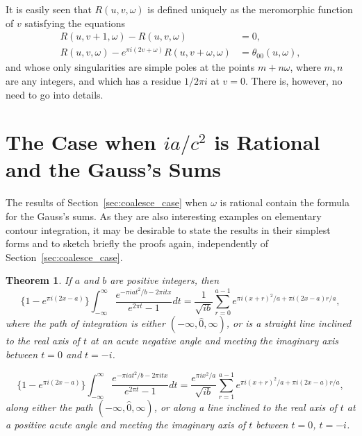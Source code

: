 \documentclass[12pt]{article}
\newtheorem{theorem}{Theorem}[section]
\theoremstyle{remark}
\begin{document}
It is easily seen that $R(u, v, \omega)$ is defined uniquely as the meromorphic function of $v$ satisfying the equations
\begin{align}
R(u, v + 1, \omega) - R(u, v, \omega) &= 0, \label{eq:R_functional1}\\
R(u, v, \omega) - e^{\pi i(2v+\omega)} R(u, v + \omega, \omega) &= \theta_{00}(u, \omega), \label{eq:R_functional2}
\end{align}
and whose only singularities are simple poles at the points $m + n\omega$, where $m, n$ are any integers, and which has a residue $1/2\pi i$ at $v = 0$. There is, however, no need to go into details.

\section{The Case when $ia/c^2$ is Rational and the Gauss's Sums}\label{sec:gauss_sums}

The results of Section~\ref{sec:coalesce_case} when $\omega$ is rational contain the formula for the Gauss's sums. As they are also interesting examples on elementary contour integration, it may be desirable to state the results in their simplest forms and to sketch briefly the proofs again, independently of Section~\ref{sec:coalesce_case}.

\begin{theorem}\label{thm:gauss_sums}
If $a$ and $b$ are positive integers, then
\begin{equation}\label{eq:gauss_formula1}
\{1 - e^{\pi i(2x-a)}\} \int_{-\infty}^\infty \frac{e^{-\pi iat^2/b - 2\pi itx}}{e^{2\pi t} - 1} dt = \frac{1}{\sqrt{ib}} \sum_{r=0}^{a-1} e^{\pi i(x+r)^2/a + \pi i(2x-a)r/a},
\end{equation}
where the path of integration is either $(-\infty, \hat{0}, \infty)$, or is a straight line inclined to the real axis of $t$ at an acute negative angle and meeting the imaginary axis between $t=0$ and $t=-i$.

\begin{equation}\label{eq:gauss_formula2}
\{1 - e^{\pi i(2x-a)}\} \int_{-\infty}^\infty \frac{e^{-\pi iat^2/b - 2\pi itx}}{e^{2\pi t} - 1} dt = \frac{e^{\pi ix^2/a}}{\sqrt{ib}} \sum_{r=1}^{a-1} e^{\pi i(x+r)^2/a + \pi i(2x-a)r/a},
\end{equation}
along either the path $(-\infty, \hat{0}, \infty)$, or along a line inclined to the real axis of $t$ at a positive acute angle and meeting the imaginary axis of $t$ between $t = 0$, $t = -i$.
\end{theorem}
\end{document}

